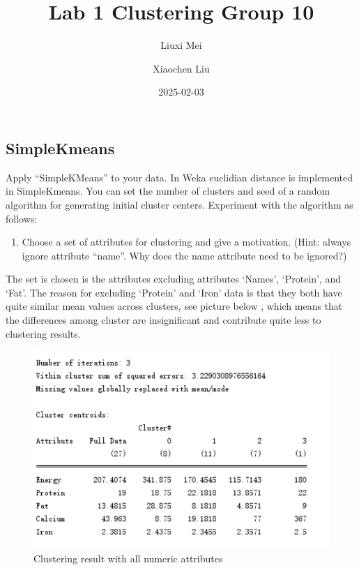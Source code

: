 \documentclass[
]{article}
\title{Lab 1 Clustering Group 10}
\author{Liuxi Mei \and Xiaochen Liu}
\date{2025-02-03}
\providecommand{\tightlist}{%
  \setlength{\itemsep}{0pt}\setlength{\parskip}{0pt}}
\begin{document}
\maketitle

\subsection{SimpleKmeans}\label{simplekmeans}

Apply ``SimpleKMeans'' to your data. In Weka euclidian distance is
implemented in SimpleKmeans. You can set the number of clusters and seed
of a random algorithm for generating initial cluster centers. Experiment
with the algorithm as follows:

\begin{enumerate}
\def\labelenumi{\arabic{enumi})}
\tightlist
\item
  Choose a set of attributes for clustering and give a motivation.
  (Hint: always ignore attribute ``name''. Why does the name attribute
  need to be ignored?)
\end{enumerate}

The set is chosen is the attributes excluding attributes `Names',
`Protein', and `Fat'. The reason for excluding `Protein' and `Iron' data
is that they both have quite similar mean values across clusters, see
picture below , which means that the differences among cluster are
insignificant and contribute quite less to clustering results.

\begin{figure}
\centering
\includegraphics[width=5.20833in,height=\textheight]{Pictures/1.png}
\caption{Clustering result with all numeric attributes}
\end{figure}
\end{document}
